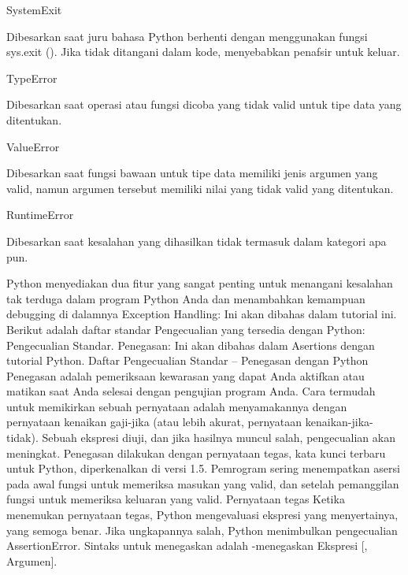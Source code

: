 \noindent 
SystemExit \hspace*{0.5in}  \par
\noindent 
Dibesarkan saat juru bahasa Python berhenti dengan menggunakan fungsi sys.exit (). Jika tidak ditangani dalam kode, menyebabkan penafsir untuk keluar. \par
\vspace{12pt}
\noindent 
TypeError \hspace*{0.5in}  \par
\noindent 
Dibesarkan saat operasi atau fungsi dicoba yang tidak valid untuk tipe data yang ditentukan. \par
\vspace{12pt}
\noindent 
ValueError \hspace*{0.5in}  \par
\noindent 
Dibesarkan saat fungsi bawaan untuk tipe data memiliki jenis argumen yang valid, namun argumen tersebut memiliki nilai yang tidak valid yang ditentukan. \par
\vspace{12pt}
\noindent 
RuntimeError \hspace*{0.5in}  \par
\noindent 
Dibesarkan saat kesalahan yang dihasilkan tidak termasuk dalam kategori apa pun. \par
\vspace{12pt}
\noindent 
 \hspace*{0.64in} Python menyediakan dua fitur yang sangat penting untuk menangani kesalahan tak terduga dalam program Python Anda dan menambahkan kemampuan debugging di dalamnya Exception Handling: Ini akan dibahas dalam tutorial ini. Berikut adalah daftar standar Pengecualian yang tersedia dengan Python: Pengecualian Standar. Penegasan: Ini akan dibahas dalam Asertions dengan tutorial Python. Daftar Pengecualian Standar – Penegasan dengan Python Penegasan adalah pemeriksaan kewarasan yang dapat Anda aktifkan atau matikan saat Anda selesai dengan pengujian program Anda. Cara termudah untuk memikirkan sebuah pernyataan adalah menyamakannya dengan pernyataan kenaikan gaji-jika (atau lebih akurat, pernyataan kenaikan-jika-tidak). Sebuah ekspresi diuji, dan jika hasilnya muncul salah, pengecualian akan meningkat. Penegasan dilakukan dengan pernyataan tegas, kata kunci terbaru untuk Python, diperkenalkan di versi 1.5. Pemrogram sering menempatkan asersi pada awal fungsi untuk memeriksa masukan yang valid, dan setelah pemanggilan fungsi untuk memeriksa keluaran yang valid. Pernyataan tegas Ketika menemukan pernyataan tegas, Python mengevaluasi ekspresi yang menyertainya, yang semoga benar. Jika ungkapannya salah, Python menimbulkan pengecualian AssertionError. Sintaks untuk menegaskan adalah -menegaskan Ekspresi [, Argumen]. \par
